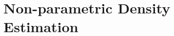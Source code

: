 \chapter{Non-parametric Density Estimation}
\begin{refsection}
  
\printbibliography[heading=subbibliography]
\end{refsection}